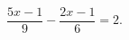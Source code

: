 \begin{ex}[type=equation]
	\begin{condition}
		$\dfrac{5x - 1}{9}-\dfrac{2x - 1}{6} = 2.$
	\end{condition}
\end{ex}